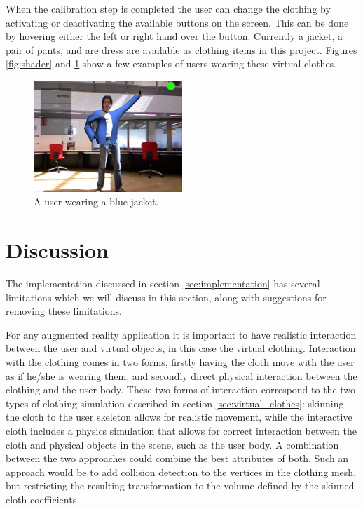 \documentclass[twocolumn,a4paper]{article}
\begin{document}
When the calibration step is completed the user can change the clothing by activating or deactivating the available buttons on the screen. This can be done by hovering either the left or right hand over the button.
Currently a jacket, a pair of pants, and are dress are available as clothing items in this project.
Figures \ref{fig:shader} and \ref{fig:jacket_morris} show a few examples of users wearing these virtual clothes.

\begin{figure}[h!]
\centering
\includegraphics[width=0.5\textwidth]{GUI_jacket_morris.png} 
\caption{A user wearing a blue jacket.}
\label{fig:jacket_morris}
\end{figure}

\section{Discussion}
\label{sec:discussion}

The implementation discussed in section \ref{sec:implementation} has several limitations which we will discuss in this section, along with suggestions for removing these limitations. 

For any augmented reality application it is important to have realistic interaction between the user and virtual objects, in this case the virtual clothing. Interaction with the clothing comes in two forms, firstly having the cloth move with the user as if he/she is wearing them, and secondly direct physical interaction between the clothing and the user body. These two forms of interaction correspond to the two types of clothing simulation described in section \ref{sec:virtual_clothes}: skinning the cloth to the user skeleton allows for realistic movement, while the interactive cloth includes a physics simulation that allows for correct interaction between the cloth and physical objects in the scene, such as the user body. A combination between the two approaches could combine the best attributes of both. Such an approach would be to add collision detection to the vertices in the clothing mesh, but restricting the resulting transformation to the volume defined by the skinned cloth coefficients.
\end{document}
